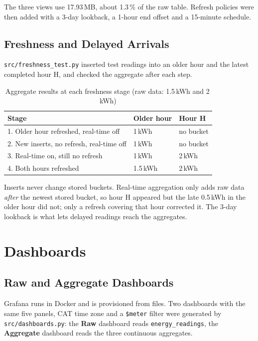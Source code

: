 \documentclass[11pt,a4paper]{article}
\begin{document}
The three views use 17.93\,MB, about 1.3\,\% of the raw table. Refresh policies were then added with a 3-day lookback, a 1-hour end offset and a 15-minute schedule.

\subsection{Freshness and Delayed Arrivals}

\texttt{src/freshness\_test.py} inserted test readings into an older hour and the latest completed hour H, and checked the aggregate after each step.

\begin{table}[H]
\centering
\begin{tabular}{lll}
\toprule
\textbf{Stage} & \textbf{Older hour} & \textbf{Hour H} \\
\midrule
1. Older hour refreshed, real-time off & 1\,kWh & no bucket \\
2. New inserts, no refresh, real-time off & 1\,kWh & no bucket \\
3. Real-time on, still no refresh & 1\,kWh & 2\,kWh \\
4. Both hours refreshed & 1.5\,kWh & 2\,kWh \\
\bottomrule
\end{tabular}
\caption{Aggregate results at each freshness stage (raw data: 1.5\,kWh and 2\,kWh)}
\end{table}

Inserts never change stored buckets. Real-time aggregation only adds raw data \emph{after} the newest stored bucket, so hour H appeared but the late 0.5\,kWh in the older hour did not; only a refresh covering that hour corrected it. The 3-day lookback is what lets delayed readings reach the aggregates.

\section{Dashboards}

\subsection{Raw and Aggregate Dashboards}

Grafana runs in Docker and is provisioned from files. Two dashboards with the same five panels, CAT time zone and a \texttt{\$meter} filter were generated by \texttt{src/dashboards.py}: the \textbf{Raw} dashboard reads \texttt{energy\_readings}, the \textbf{Aggregate} dashboard reads the three continuous aggregates.
\end{document}
